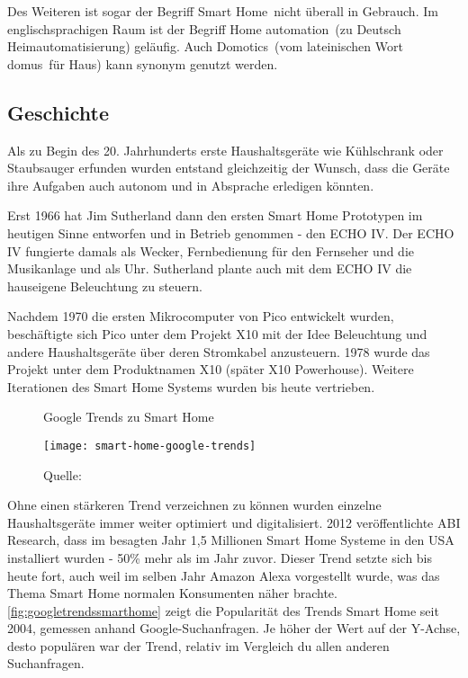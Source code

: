 Des Weiteren ist sogar der Begriff \glqq Smart Home\grqq \ nicht überall in Gebrauch. Im englischsprachigen Raum ist der Begriff \glqq Home automation\grqq \ (zu Deutsch \glqq Heimautomatisierung\grqq ) geläufig.
Auch \glqq Domotics\grqq \ (vom lateinischen Wort \glqq domus\grqq \ für \glqq Haus\grqq ) kann synonym genutzt werden.

\subsection{Geschichte}

Als zu Begin des 20. Jahrhunderts erste Haushaltsgeräte wie Kühlschrank oder Staubsauger erfunden wurden entstand gleichzeitig der Wunsch, dass die Geräte ihre Aufgaben auch autonom und in Absprache erledigen könnten.

Erst 1966 hat Jim Sutherland dann den ersten Smart Home Prototypen im heutigen Sinne entworfen und in Betrieb genommen - den \ac{ECHO} IV.
Der \ac{ECHO} IV fungierte damals als Wecker, Fernbedienung für den Fernseher und die Musikanlage und als Uhr.
Sutherland plante auch mit dem \ac{ECHO} IV die hauseigene Beleuchtung zu steuern.

Nachdem 1970 die ersten Mikrocomputer von Pico entwickelt wurden, beschäftigte sich Pico unter dem Projekt X10 mit der Idee Beleuchtung und andere Haushaltsgeräte über deren Stromkabel anzusteuern.
1978 wurde das Projekt unter dem Produktnamen X10 (später X10 Powerhouse).
Weitere Iterationen des Smart Home Systems wurden bis heute vertrieben.

\begin{figure}[ht]
	\centering
	\caption{Google Trends zu Smart Home}
	\texttt{[image: smart-home-google-trends]}
	\caption*{\footnotesize{Quelle: }}
	\label{fig:googletrendssmarthome}
\end{figure}

Ohne einen stärkeren Trend verzeichnen zu können wurden einzelne Haushaltsgeräte immer weiter optimiert und digitalisiert.
2012 veröffentlichte ABI Research, dass im besagten Jahr 1,5 Millionen Smart Home Systeme in den USA installiert wurden - 50\% mehr als im Jahr zuvor.
Dieser Trend setzte sich bis heute fort, auch weil im selben Jahr Amazon Alexa vorgestellt wurde, was das Thema Smart Home normalen Konsumenten näher brachte.
\autoref{fig:googletrendssmarthome} zeigt die Popularität des Trends Smart Home seit 2004, gemessen anhand Google-Suchanfragen.
Je höher der Wert auf der Y-Achse, desto populären war der Trend, relativ im Vergleich du allen anderen Suchanfragen.

